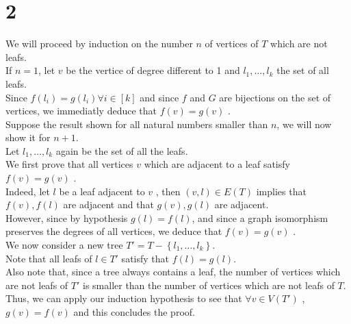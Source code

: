 \documentclass[11pt, a4paper]{article}
\begin{document}
\section*{2}
We will proceed by induction on the number $n$  of vertices of $T$ which are not leafs.\\
If $n=1$, let $v$ be the vertice of degree different to 1 and $l_1, \ldots, l_k$ the set of all leafs.\\
Since $ f( l_i) = g( l_i) \forall i \in [ k]  $ and since $f$ and $G$ are bijections on the set of vertices, we immediatly deduce that $f( v) = g( v) $ .\\
Suppose the result shown for all natural numbers smaller than $n$, we will now show it for $n+1$.\\
Let $l_1, \ldots, l_k$ again be the set of all the leafs.\\
We first prove that all vertices $v$  which are adjacent to a leaf satisfy $f( v) = g( v) $ .\\
Indeed, let $l$ be a leaf adjacent to $v$ , then $( v,l) \in E( T) $ implies that $f(v) , f( l) $ are adjacent and that $g( v) , g( l) $ are adjacent.\\
However, since by hypothesis $g( l) = f( l) $, and since a graph isomorphism preserves the degrees of all vertices, we deduce that $f( v) = g( v) $ .\\
We now consider a new tree $T' = T - \left\{ l_1, \ldots, l_k \right\} $.\\
Note that all leafs of $l \in T'$ satisfy that $ f( l) = g( l) $.\\
Also note that, since a tree always contains a leaf, the number of vertices which are not leafs of $T'$ is smaller than the number of vertices which are not leafs of $T$.\\
Thus, we can apply our induction hypothesis to see that $\forall v \in V(  T')$ , $g( v) = f( v) $ and this concludes the proof.
\end{document}
